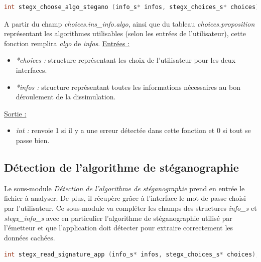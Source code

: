 \documentclass[11pt]{article}
\begin{document}
\begin{lstlisting}[language=c]
int stegx_choose_algo_stegano (info_s* infos, stegx_choices_s* choices); 
\end{lstlisting}

A partir du champ \textit{choices.ins\_info.algo}, 
ainsi que du tableau \textit{choices.proposition} représentant les algorithmes 
utilisables (selon les entrées de l'utilisateur), cette fonction remplira 
\textit{algo} de \textit{infos}. 
\newline
\underline{Entrées :}
\begin{itemize}
\item \textit{*choices :} structure représentant les choix de 
l'utilisateur pour les deux interfaces. 
\item \textit{*infos :} structure représentant toutes les informations 
nécessaires au bon déroulement de la dissimulation. 
\end{itemize}
\underline{Sortie :} 
\begin{itemize}
\item \textit{int :} renvoie 1 si il y a une erreur détectée dans cette 
fonction et 0 si tout se passe bien.  
\newline 
\end{itemize}

\subsection{Détection de l'algorithme de stéganographie}

Le sous-module \textit{Détection de l'algorithme de stéganographie} prend en 
entrée le fichier à analyser. De plus, il récupère grâce à l'interface le 
mot de passe choisi par l'utilisateur.  
Ce sous-module va compléter les champs des structures \textit{info\_s} 
et \textit{stegx\_info\_s} avec en particulier l'algorithme de stéganographie 
utilisé par l'émetteur et que l'application doit détecter pour extraire 
correctement les données cachées. 

\begin{lstlisting}[language=c]
int stegx_read_signature_app (info_s* infos, stegx_choices_s* choices); 
\end{lstlisting}
\end{document}
